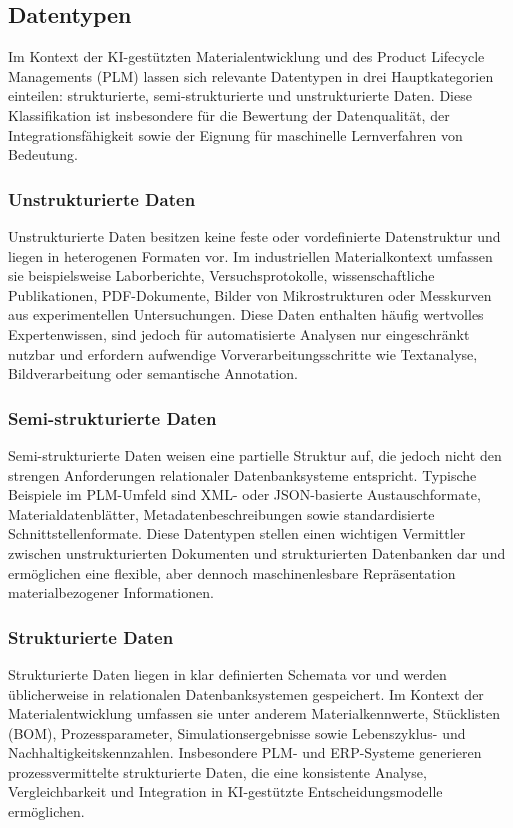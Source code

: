 \subsection{Datentypen}
Im Kontext der KI-gestützten Materialentwicklung und des Product Lifecycle Managements (PLM) lassen sich relevante Datentypen in drei Hauptkategorien einteilen: strukturierte, semi-strukturierte und unstrukturierte Daten. Diese Klassifikation ist insbesondere für die Bewertung der Datenqualität, der Integrationsfähigkeit sowie der Eignung für maschinelle Lernverfahren von Bedeutung.  \cite{bry2001aktuelles}


\subsubsection{Unstrukturierte Daten}
Unstrukturierte Daten besitzen keine feste oder vordefinierte Datenstruktur und liegen in heterogenen Formaten vor. Im industriellen Materialkontext umfassen sie beispielsweise Laborberichte, Versuchsprotokolle, wissenschaftliche Publikationen, PDF-Dokumente, Bilder von Mikrostrukturen oder Messkurven aus experimentellen Untersuchungen.
Diese Daten enthalten häufig wertvolles Expertenwissen, sind jedoch für automatisierte Analysen nur eingeschränkt nutzbar und erfordern aufwendige Vorverarbeitungsschritte wie Textanalyse, Bildverarbeitung oder semantische Annotation. \cite{katal2013big}

\subsubsection{Semi-strukturierte Daten}
Semi-strukturierte Daten weisen eine partielle Struktur auf, die jedoch nicht den strengen Anforderungen relationaler Datenbanksysteme entspricht. Typische Beispiele im PLM-Umfeld sind XML- oder JSON-basierte Austauschformate, Materialdatenblätter, Metadatenbeschreibungen sowie standardisierte Schnittstellenformate.
Diese Datentypen stellen einen wichtigen Vermittler zwischen unstrukturierten Dokumenten und strukturierten Datenbanken dar und ermöglichen eine flexible, aber dennoch maschinenlesbare Repräsentation materialbezogener Informationen. \cite{barowy2015flashrelate}

\subsubsection{Strukturierte Daten}
Strukturierte Daten liegen in klar definierten Schemata vor und werden üblicherweise in relationalen Datenbanksystemen gespeichert. Im Kontext der Materialentwicklung umfassen sie unter anderem Materialkennwerte, Stücklisten (BOM), Prozessparameter, Simulationsergebnisse sowie Lebenszyklus- und Nachhaltigkeitskennzahlen.
Insbesondere PLM- und ERP-Systeme generieren prozessvermittelte strukturierte Daten, die eine konsistente Analyse, Vergleichbarkeit und Integration in KI-gestützte Entscheidungsmodelle ermöglichen. \cite{arasu2003extracting}








